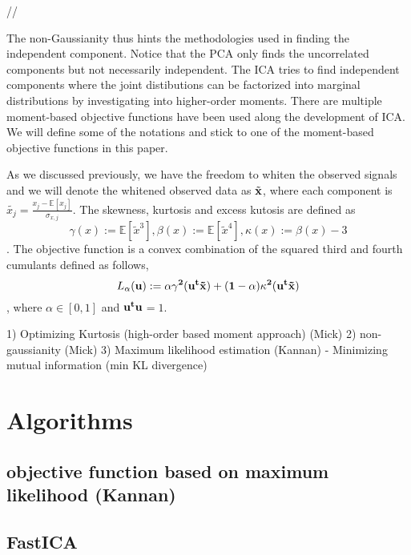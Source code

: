\documentclass[aps,prl,preprint,superscriptaddress]{revtex4-2}
\begin{document}
//



The non-Gaussianity thus hints the methodologies used in finding the independent component. Notice that the PCA only finds the uncorrelated components but not necessarily independent. The ICA tries to find independent components where the joint distibutions can be factorized into marginal distributions by investigating into higher-order moments. There are multiple moment-based objective functions have been used along the development of ICA. We will define some of the notations and stick to one of the moment-based objective functions in this paper.  

As we discussed previously, we have the freedom to whiten the observed signals and we will denote the whitened observed data as $\tilde{\bf{x}}$, where each component is $\tilde{x_{j}} = \frac{x_{j}-\mathbb{E}[x_{j}]}{\sigma_{x,j}}$. The skewness, kurtosis and excess kutosis are defined as $$ \gamma(x) := \mathbb{E}[\tilde{x}^{3}], \beta(x) := \mathbb{E}[\tilde{x}^{4}], \kappa(x) := \beta(x)-3 $$.
The objective function is a convex combination of the squared third and fourth cumulants defined as follows,
\begin{equation}
L_{\alpha}(\bf{u}) := \alpha \gamma^{2}(\bf{u}^{t}\tilde{\bf{x}}) + (1-\alpha)\kappa^{2}(\bf{u}^{t}\tilde{\bf{x}})
\end{equation},
where $\alpha \in [0, 1]$ and $\bf{u}^{t}\bf{u}$$ = 1$.

1) Optimizing Kurtosis (high-order based moment approach) (Mick)
2) non-gaussianity  (Mick)
3) Maximum likelihood estimation (Kannan)
    - Minimizing mutual information (min KL divergence)

\section{Algorithms}
\subsection{objective function based on maximum likelihood  (Kannan)}

\subsection{FastICA}
\end{document}
